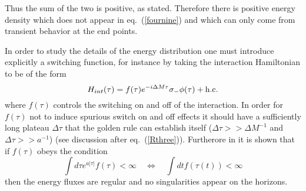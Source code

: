 \documentclass[12pt,oneside]{report}
\begin{document}
Thus the sum of the two is positive, as stated.
Therefore there is  positive energy density
which does not appear in eq.~(\ref{fournine}) and which
can only come  from transient behavior at the end points.


In order to study the details of  the energy distribution one must introduce
explicitly a switching function, for instance by  taking the
interaction Hamiltonian to be of the form \begin{equation}
H_{int} (\tau)= f(\tau) e^{-i \Delta M \tau} \sigma_- \phi(\tau) +
\hbox{h.c.} \label{fiveseven}
\end{equation}
where $f(\tau)$ controls the switching on and off of the interaction.
In order for $f(\tau)$ not to induce spurious switch on and off effects it
should have a sufficiently long plateau $\Delta \tau$ that the golden rule can
establish itself ($\Delta \tau >> \Delta  M^{-1}$ and $\Delta \tau >> a^{-1}$)
(see discussion after eq.~(\ref{Rthree})).
Furtherore in  \cite{MaPa}
it is shown that if $f(\tau)$ obeys the condition
\begin{equation}
\int d\tau e^{a\vert \tau \vert} f(\tau) < \infty
\quad \Leftrightarrow \quad
\int dt f(\tau(t)) < \infty
\label{fiveeight}
\end{equation}
then the energy fluxes are regular and no singularities appear on the
horizons.
\end{document}
